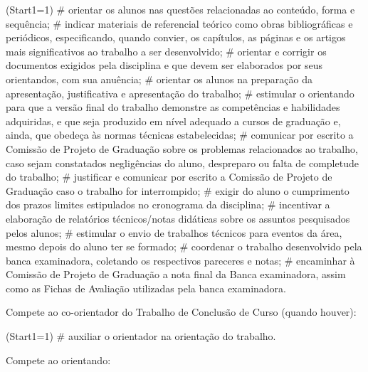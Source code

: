 \documentclass[12pt,geral,titlewithdate]{uftdocs}
\begin{document}
\begin{easylist}\ListProperties(Start1=1)
# orientar os alunos nas questões relacionadas ao conteúdo, forma e sequência;
# indicar materiais de referencial teórico como obras bibliográficas e periódicos, especificando, quando convier, os capítulos, as páginas e os artigos mais significativos ao trabalho a ser desenvolvido;
# orientar e corrigir os documentos exigidos pela disciplina e que devem ser elaborados por seus orientandos, com sua anuência;
# orientar os alunos na preparação da apresentação, justificativa e apresentação do trabalho;
# estimular o orientando para que a versão final do trabalho demonstre as competências e habilidades adquiridas, e que seja produzido em nível adequado a cursos de graduação e, ainda, que obedeça às normas técnicas estabelecidas;
# comunicar por escrito a Comissão de Projeto de Graduação sobre os problemas relacionados ao trabalho, caso sejam constatados negligências do aluno, despreparo ou falta de completude do trabalho;
# justificar e comunicar por escrito a Comissão de Projeto de Graduação caso o trabalho for interrompido;
# exigir do aluno o cumprimento dos prazos limites estipulados no cronograma da disciplina;
# incentivar a elaboração de relatórios técnicos/notas didáticas sobre os assuntos pesquisados pelos alunos;
# estimular o envio de trabalhos técnicos para eventos da área, mesmo depois do aluno ter se formado;
# coordenar o trabalho desenvolvido pela banca examinadora, coletando os respectivos pareceres e notas;
# encaminhar à Comissão de Projeto de Graduação a nota final da Banca examinadora, assim como as Fichas de Avaliação utilizadas pela banca examinadora.
\end{easylist}

\artigo Compete ao co-orientador do Trabalho de Conclusão de Curso (quando
houver):

\begin{easylist}\ListProperties(Start1=1)
# auxiliar o orientador na orientação do trabalho. 
\end{easylist}

\artigo Compete ao orientando:
\end{document}
